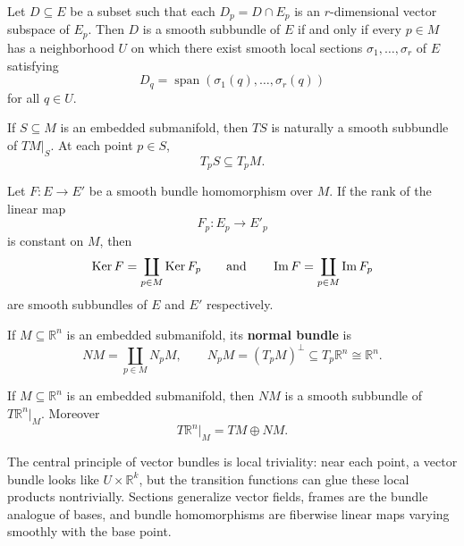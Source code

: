 \documentclass[12pt, oneside]{book}
\begin{document}
\begin{lemma}
    Let $D\subseteq E$ be a subset such that each $D_p=D\cap E_p$ is an $r$-dimensional vector subspace of $E_p$. Then $D$ is a smooth subbundle of $E$ if and only if every $p\in M$ has a neighborhood $U$ on which there exist smooth local sections $\sigma_1,\ldots,\sigma_r$ of $E$ satisfying
    \[
        D_q=\operatorname{span}\left(\sigma_1(q),\ldots,\sigma_r(q)\right)
    \]
    for all $q\in U$.
\end{lemma}

\begin{example}
    If $S\subseteq M$ is an embedded submanifold, then $TS$ is naturally a smooth subbundle of $TM|_S$. At each point $p\in S$,
    \[
        T_pS\subseteq T_pM.
    \]
\end{example}

\begin{theorem}
    Let $F:E\rightarrow E'$ be a smooth bundle homomorphism over $M$. If the rank of the linear map
    \[
        F_p:E_p\rightarrow E'_p
    \]
    is constant on $M$, then
    \[
        \operatorname{\operatorname{Ker}} F=\coprod_{p\in M}\operatorname{\operatorname{Ker}} F_p
        \qquad\text{and}\qquad
        \operatorname{Im}F=\coprod_{p\in M}\operatorname{Im}F_p
    \]
    are smooth subbundles of $E$ and $E'$ respectively.
\end{theorem}

\begin{definition}
    If $M\subseteq \mathbb{R}^n$ is an embedded submanifold, its \textbf{normal bundle} is
    \[
        NM
        =
        \coprod_{p\in M}N_pM,
        \qquad
        N_pM=\left(T_pM\right)^\perp\subseteq T_p\mathbb{R}^n\cong \mathbb{R}^n.
    \]
\end{definition}

\begin{corollary}
    If $M\subseteq \mathbb{R}^n$ is an embedded submanifold, then $NM$ is a smooth subbundle of $T\mathbb{R}^n|_M$. Moreover
    \[
        T\mathbb{R}^n|_M
        =
        TM\oplus NM.
    \]
\end{corollary}

\begin{remark}
    The central principle of vector bundles is local triviality: near each point, a vector bundle looks like $U\times\mathbb{R}^k$, but the transition functions can glue these local products nontrivially. Sections generalize vector fields, frames are the bundle analogue of bases, and bundle homomorphisms are fiberwise linear maps varying smoothly with the base point.
\end{remark}
\end{document}
